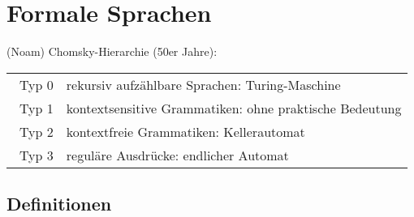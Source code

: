 \section{Formale Sprachen}
(Noam) Chomsky-Hierarchie (50er Jahre):
\settowidth{\MyLenA}{~Typ 0~~}
\begin{tabular}{@{}p{\the\MyLenA}%
				@{}p{\linewidth-\the\MyLenA}}
~Typ 0 & rekursiv aufzählbare Sprachen: Turing-Maschine\\
~Typ 1 & kontextsensitive Grammatiken: ohne praktische Bedeutung\\
~Typ 2 & kontextfreie Grammatiken: Kellerautomat\\
~Typ 3 & reguläre Ausdrücke: endlicher Automat\\
\end{tabular}

\subsection{Definitionen}
